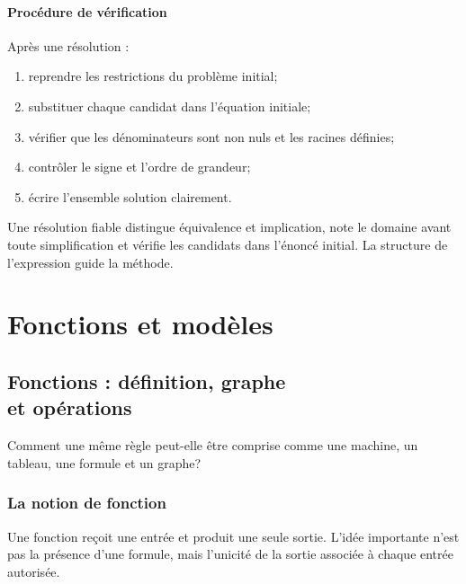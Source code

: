 \documentclass[12pt,a4paper,openany]{book}
\begin{document}
\subsection{Procédure de vérification}

Après une résolution :
\begin{enumerate}
\item reprendre les restrictions du problème initial;
\item substituer chaque candidat dans l'équation initiale;
\item vérifier que les dénominateurs sont non nuls et les racines définies;
\item contrôler le signe et l'ordre de grandeur;
\item écrire l'ensemble solution clairement.
\end{enumerate}

\begin{summarybox}
Une résolution fiable distingue équivalence et implication, note le domaine avant toute simplification et vérifie les candidats dans l'énoncé initial. La structure de l'expression guide la méthode.
\end{summarybox}


\part{Fonctions et modèles}

\chapter[Fonctions : définition, graphe et opérations]{Fonctions : définition, graphe\\et opérations}

\begin{questionbox}
Comment une même règle peut-elle être comprise comme une machine, un tableau, une formule et un graphe?
\end{questionbox}

\section{La notion de fonction}

\begin{intuitionbox}
Une fonction reçoit une entrée et produit une seule sortie. L'idée importante n'est pas la présence d'une formule, mais l'unicité de la sortie associée à chaque entrée autorisée.
\end{intuitionbox}
\end{document}
